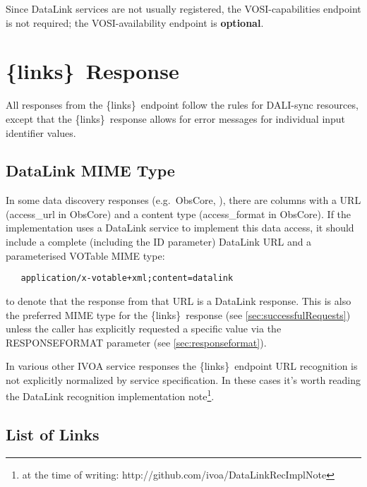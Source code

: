 \documentclass[11pt,a4paper]{ivoa}
\newcommand{\blinks}{\{links\}}
\newcommand{\rfcoptional}{\textbf{optional}}
\begin{document}
Since DataLink services are not usually registered, the VOSI-capabilities endpoint
is not required; the VOSI-availability endpoint is \rfcoptional.

\section{\blinks\ Response}

All responses from the \blinks\ endpoint follow the rules for DALI-sync
resources, except that the \blinks\ response allows for error
messages for individual input identifier values.


\subsection{DataLink MIME Type}
\label{sec:mime}

In some data discovery responses (e.g.\ ObsCore, \citet{2017ivoa.spec.0509L}),
there are columns
with a URL (access\_url in ObsCore) and a content type (access\_format in
ObsCore). If the implementation uses a DataLink service to implement this
data access, it should include a complete (including the ID parameter)
DataLink URL and a parameterised VOTable MIME type:
\begin{verbatim}
   application/x-votable+xml;content=datalink
\end{verbatim}
to denote that the response from that URL is a DataLink response.
This is also the preferred MIME type for the \blinks\ response
(see \ref{sec:successfulRequests})
unless the caller has explicitly requested a specific value
via the RESPONSEFORMAT parameter (see \ref{sec:responseformat}).

In various other IVOA service responses the \blinks\ endpoint URL 
recognition is not explicitly normalized by service specification. In
these cases it's worth reading the DataLink recognition 
implementation note\footnote{at the time of writing: 
http://github.com/ivoa/DataLinkRecImplNote}. 


\subsection{List of Links}
\label{sec:listOfLinks}
\end{document}

